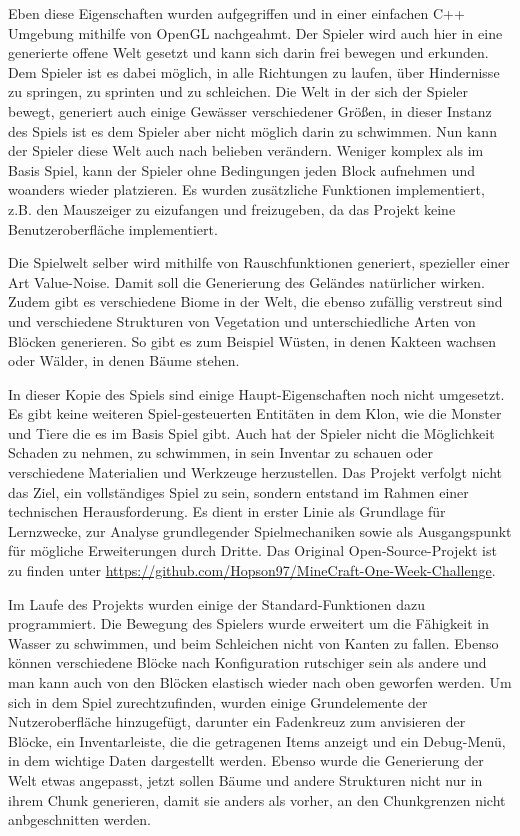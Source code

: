 \documentclass{article}
\begin{document}
Eben diese Eigenschaften wurden aufgegriffen und in einer einfachen C++ Umgebung mithilfe von OpenGL nachgeahmt. Der Spieler wird auch hier in eine generierte offene Welt gesetzt und kann sich darin frei bewegen und erkunden. Dem Spieler ist es dabei möglich, in alle Richtungen zu laufen, über Hindernisse zu springen, zu sprinten und zu schleichen. Die Welt in der sich der Spieler bewegt, generiert auch einige Gewässer verschiedener Grö\ss{}en, in dieser Instanz des Spiels ist es dem Spieler aber nicht möglich darin zu schwimmen. Nun kann der Spieler diese Welt auch nach belieben verändern. Weniger komplex als im Basis Spiel, kann der Spieler ohne Bedingungen jeden Block aufnehmen und woanders wieder platzieren. Es wurden zusätzliche Funktionen implementiert, z.B. den Mauszeiger zu eizufangen und freizugeben, da das Projekt keine Benutzeroberfläche implementiert.

Die Spielwelt selber wird mithilfe von Rauschfunktionen generiert, spezieller einer Art Value-Noise. Damit soll die Generierung des Geländes natürlicher wirken. Zudem gibt es verschiedene Biome in der Welt, die ebenso zufällig verstreut sind und verschiedene Strukturen von Vegetation und unterschiedliche Arten von Blöcken generieren. So gibt es zum Beispiel Wüsten, in denen Kakteen wachsen oder Wälder, in denen Bäume stehen.

In dieser Kopie des Spiels sind einige Haupt-Eigenschaften noch nicht umgesetzt. Es gibt keine weiteren Spiel-gesteuerten Entitäten in dem Klon, wie die Monster und Tiere die es im Basis Spiel gibt. Auch hat der Spieler nicht die Möglichkeit Schaden zu nehmen, zu schwimmen, in sein Inventar zu schauen oder verschiedene Materialien und Werkzeuge herzustellen. Das Projekt verfolgt nicht das Ziel, ein vollständiges Spiel zu sein, sondern entstand im Rahmen einer technischen Herausforderung. Es dient in erster Linie als Grundlage für Lernzwecke, zur Analyse grundlegender Spielmechaniken sowie als Ausgangspunkt für mögliche Erweiterungen durch Dritte. Das Original Open-Source-Projekt ist zu finden unter \url{https://github.com/Hopson97/MineCraft-One-Week-Challenge}.

Im Laufe des Projekts wurden einige der Standard-Funktionen dazu programmiert. Die Bewegung des Spielers wurde erweitert um die Fähigkeit in Wasser zu schwimmen, und beim Schleichen nicht von Kanten zu fallen. Ebenso können verschiedene Blöcke nach Konfiguration rutschiger sein als andere und man kann auch von den Blöcken elastisch wieder nach oben geworfen werden. Um sich in dem Spiel zurechtzufinden, wurden einige Grundelemente der Nutzeroberfläche hinzugefügt, darunter ein Fadenkreuz zum anvisieren der Blöcke, ein Inventarleiste, die die getragenen Items anzeigt und ein Debug-Menü, in dem wichtige Daten dargestellt werden. Ebenso wurde die Generierung der Welt etwas angepasst, jetzt sollen Bäume und andere Strukturen nicht nur in ihrem Chunk generieren, damit sie anders als vorher, an den Chunkgrenzen nicht anbgeschnitten werden.
\end{document}
